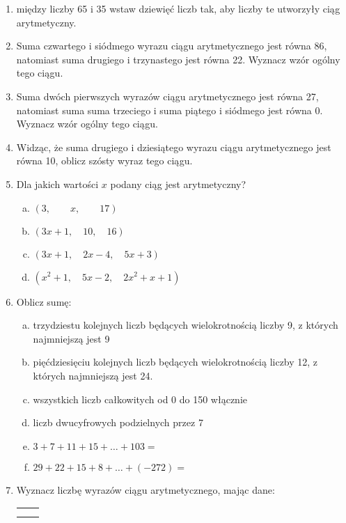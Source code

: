\documentclass[12pt,a4paper]{article}
\begin{document}
\begin{enumerate}[1.]
		\item między liczby 65 i 35 wstaw dziewięć liczb tak, aby liczby te utworzyły ciąg arytmetyczny.
		
		\item Suma czwartego i siódmego wyrazu ciągu arytmetycznego jest równa 86, natomiast suma drugiego i trzynastego jest równa 22. Wyznacz wzór ogólny tego ciągu.
		
		\item Suma dwóch pierwszych wyrazów ciągu arytmetycznego jest równa 27, natomiast suma suma trzeciego i suma piątego i siódmego jest równa 0. Wyznacz wzór ogólny tego ciągu.
		
		\item Widząc, że suma drugiego i dziesiątego wyrazu ciągu arytmetycznego jest równa 10, oblicz szósty wyraz tego ciągu.
		
		\item Dla jakich wartości $x$ podany ciąg jest arytmetyczny?
		\begin{enumerate}[a)]
			\item $(3,\qquad x ,\qquad 17) $ 
			\item $(3x+1, \quad 10,\quad 16) $
			\item $(3x+1, \quad 2x-4, \quad 5x+3) $
			\item $(x^2+1, \quad 5x-2, \quad2x^2+x+1) $
		\end{enumerate}
	\newpage
		\item Oblicz sumę:
		\begin{enumerate}[a)]
			\item trzydziestu kolejnych liczb będących wielokrotnością liczby 9, z których najmniejszą jest 9
			\item pięćdziesięciu kolejnych liczb będących wielokrotnością liczby 12, z których najmniejszą jest 24.
			\item wszystkich liczb całkowitych od 0 do 150 włącznie
			\item liczb dwucyfrowych podzielnych przez 7
			\item $3+7+11+15+\dots+103=$
			\item $29+22+15+8+\dots+(-272)=$
		\end{enumerate}
	\item Wyznacz liczbę wyrazów ciągu arytmetycznego, mając dane:
		\begin{enumerate}[a)] \begin{tabular}{p{7cm} p{7cm}} 
		\item $S_n=407 \quad a_1=62 \quad a_n=12$& \vspace{0.4cm} 	\item $S_n=420 \quad a_1=62 \quad r=3$ \\
		\item $S_n=1016,5 \quad a_1=22 \quad a_n=85$&  	\item $S_n=578 \quad a_1=58 \quad a_n=-3$ \\
		\end{tabular} \end{enumerate}
	\end{enumerate}
\end{document}
